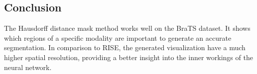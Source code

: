 \subsection{Conclusion}
The Hausdorff distance mask method works well on the BraTS dataset. It shows which regions of a specific modality are important to generate an accurate segmentation. In comparison to RISE, the generated visualization have a much higher spatial resolution, providing a better insight into the inner workings of the neural network.
